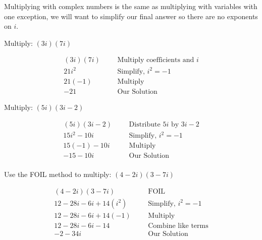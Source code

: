 \begin{nt}
Multiplying with complex numbers is the same as multiplying with variables with
one exception, we will want to simplify our final answer so there are no exponents
on $i$.
\end{nt}
\begin{exa}
Multiply: $(3i)(7i)$
\end{exa}
 \begin{align*}
	(3i)(7i)& & &\!\!\! \text{Multiply coefficients and $i$}\\
	21i^2& & &\!\!\! \text{Simplify, $i^2=-1$}\\
	21(-1)& & &\!\!\! \text{Multiply}\\
	-21& &  &\!\!\!\text{Our Solution}
 \end{align*}

\begin{exa}
    Multiply: $(5i)(3i-2)$
\end{exa}
 \begin{align*}
	(5i)(3i-2)& & &\text{Distribute $5i$ by $3i-2$}\\
	15i^2-10i& & &\text{Simplify, $i^2=-1$}\\
	15(-1)-10i& & &\text{Multiply}\\
	-15-10i& &  &\text{Our Solution}\\
 \end{align*}
\begin{exa}
 Use the FOIL method to multiply: $(4-2i)(3-7i)$
\end{exa}
 \begin{align*}
	(4-2i)(3-7i)& & &\text{FOIL}\\
	12-28i-6i+14(i^2)& & &\text{Simplify, $i^2=-1$}\\
	12-28i-6i+14(-1)& & &\text{Multiply}\\
	12-28i-6i-14& & &\text{Combine like terms}\\
	-2-34i& &  &\text{Our Solution}\\
 \end{align*}

